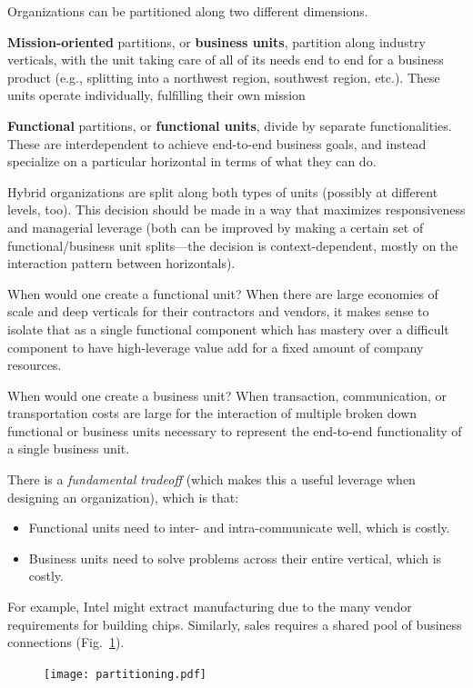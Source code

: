 \documentclass{article}
\begin{document}
Organizations can be partitioned along two different dimensions.

\textbf{Mission-oriented} partitions, or \textbf{business units}, partition along industry verticals, with the unit taking care of all of its needs end to end for a business product (e.g., splitting into a northwest region, southwest region, etc.). These units operate individually, fulfilling their own mission

\textbf{Functional} partitions, or \textbf{functional units}, divide by separate functionalities. These are interdependent to achieve end-to-end business goals, and instead specialize on a particular horizontal in terms of what they can do.

Hybrid organizations are split along both types of units (possibly at different levels, too). This decision should be made in a way that maximizes responsiveness and managerial leverage (both can be improved by making a certain set of functional/business unit splits---the decision is context-dependent, mostly on the interaction pattern between horizontals).

When would one create a functional unit? When there are large economies of scale and deep verticals for their contractors and vendors, it makes sense to isolate that as a single functional component which has mastery over a difficult component to have high-leverage value add for a fixed amount of company resources.

When would one create a business unit? When transaction, communication, or transportation costs are large for the interaction of multiple broken down functional or business units necessary to represent the end-to-end functionality of a single business unit.

There is a \textit{fundamental tradeoff} (which makes this a useful leverage when designing an organization), which is that:
\begin{itemize}
\item Functional units need to inter- and intra-communicate well, which is costly.
\item Business units need to solve problems across their entire vertical, which is costly.
\end{itemize}

For example, Intel might extract manufacturing due to the many vendor requirements for building chips. Similarly, sales requires a shared pool of business connections (Fig.~\ref{fig:partitioning}).

\begin{figure}[ht]
  \centering
  \texttt{[image: partitioning.pdf]}
  \caption{\label{fig:partitioning} }
\end{figure}
\end{document}
